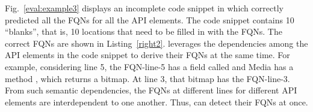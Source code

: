 Fig.~\ref{eval:example3} displays an incomplete code snippet in which
{\tool} correctly predicted all the FQNs for all the API elements. The
code snippet contains 10 ``blanks'', that is, 10 locations that need
to be filled in with the FQNs. The correct FQNs are shown in
Listing~\ref{right2}. {\tool} leverages the dependencies among the API
elements in the code snippet to derive their FQNs at the same time.
For example, considering line 5, the FQN-line-5 has a field called
 and Media has a method , which returns a
bitmap.  At line 3, that bitmap has the FQN-line-3. From such semantic
dependencies, the FQNs at different lines for different API elements
are interdependent to one another. Thus, {\tool} can detect their FQNs
at once.
